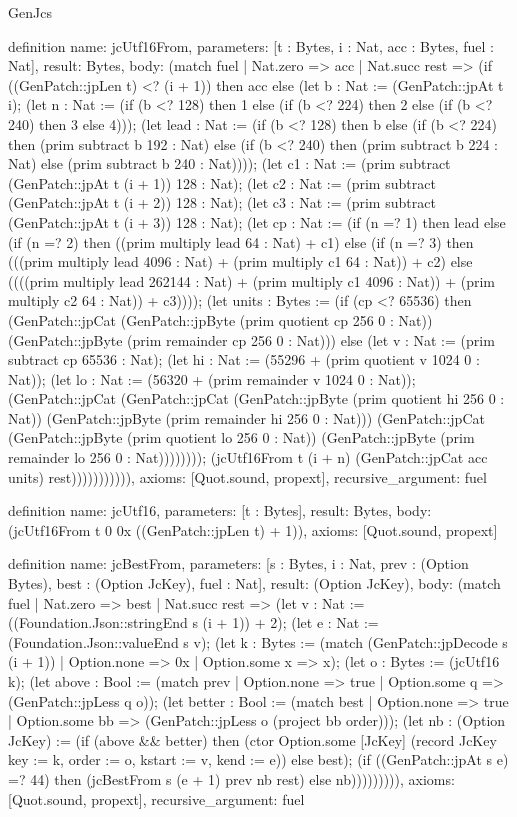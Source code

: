 \begin{lexlean}{GenJcs}
\begin{semanticmodule}
definition{
  name: jcUtf16From,
  parameters: [t : Bytes, i : Nat, acc : Bytes, fuel : Nat],
  result: Bytes,
  body: (match fuel
    | Nat.zero => acc
    | Nat.succ rest => (if ((GenPatch::jpLen t) <? (i + 1)) then acc else (let b : Nat := (GenPatch::jpAt t i); (let n : Nat := (if (b <? 128) then 1 else (if (b <? 224) then 2 else (if (b <? 240) then 3 else 4))); (let lead : Nat := (if (b <? 128) then b else (if (b <? 224) then (prim subtract b 192 : Nat) else (if (b <? 240) then (prim subtract b 224 : Nat) else (prim subtract b 240 : Nat)))); (let c1 : Nat := (prim subtract (GenPatch::jpAt t (i + 1)) 128 : Nat); (let c2 : Nat := (prim subtract (GenPatch::jpAt t (i + 2)) 128 : Nat); (let c3 : Nat := (prim subtract (GenPatch::jpAt t (i + 3)) 128 : Nat); (let cp : Nat := (if (n =? 1) then lead else (if (n =? 2) then ((prim multiply lead 64 : Nat) + c1) else (if (n =? 3) then (((prim multiply lead 4096 : Nat) + (prim multiply c1 64 : Nat)) + c2) else ((((prim multiply lead 262144 : Nat) + (prim multiply c1 4096 : Nat)) + (prim multiply c2 64 : Nat)) + c3)))); (let units : Bytes := (if (cp <? 65536) then (GenPatch::jpCat (GenPatch::jpByte (prim quotient cp 256 0 : Nat)) (GenPatch::jpByte (prim remainder cp 256 0 : Nat))) else (let v : Nat := (prim subtract cp 65536 : Nat); (let hi : Nat := (55296 + (prim quotient v 1024 0 : Nat)); (let lo : Nat := (56320 + (prim remainder v 1024 0 : Nat)); (GenPatch::jpCat (GenPatch::jpCat (GenPatch::jpByte (prim quotient hi 256 0 : Nat)) (GenPatch::jpByte (prim remainder hi 256 0 : Nat))) (GenPatch::jpCat (GenPatch::jpByte (prim quotient lo 256 0 : Nat)) (GenPatch::jpByte (prim remainder lo 256 0 : Nat)))))))); (jcUtf16From t (i + n) (GenPatch::jpCat acc units) rest))))))))))),
  axioms: [Quot.sound, propext],
  recursive_argument: fuel
}

definition{
  name: jcUtf16,
  parameters: [t : Bytes],
  result: Bytes,
  body: (jcUtf16From t 0 0x ((GenPatch::jpLen t) + 1)),
  axioms: [Quot.sound, propext]
}

definition{
  name: jcBestFrom,
  parameters: [s : Bytes, i : Nat, prev : (Option Bytes), best : (Option JcKey), fuel : Nat],
  result: (Option JcKey),
  body: (match fuel
    | Nat.zero => best
    | Nat.succ rest => (let v : Nat := ((Foundation.Json::stringEnd s (i + 1)) + 2); (let e : Nat := (Foundation.Json::valueEnd s v); (let k : Bytes := (match (GenPatch::jpDecode s (i + 1))
      | Option.none => 0x
      | Option.some x => x); (let o : Bytes := (jcUtf16 k); (let above : Bool := (match prev
      | Option.none => true
      | Option.some q => (GenPatch::jpLess q o)); (let better : Bool := (match best
      | Option.none => true
      | Option.some bb => (GenPatch::jpLess o (project bb order))); (let nb : (Option JcKey) := (if (above && better) then (ctor Option.some [JcKey] (record JcKey {key := k, order := o, kstart := v, kend := e})) else best); (if ((GenPatch::jpAt s e) =? 44) then (jcBestFrom s (e + 1) prev nb rest) else nb))))))))),
  axioms: [Quot.sound, propext],
  recursive_argument: fuel
}


\end{semanticmodule}
\end{lexlean}
